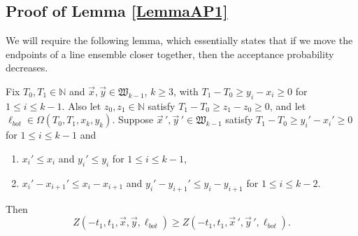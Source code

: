 	
	
	\subsection{Proof of Lemma \ref{LemmaAP1}}
	
	We will require the following lemma, which essentially states that if we move the endpoints of a line ensemble closer together, then the acceptance probability decreases.
	
	\begin{lemma}\label{APsqueezing}
		Fix $T_0,T_1\in\mathbb{N}$ and $\vec{x},\vec{y}\in\mathfrak{W}_{k-1}$, $k\geq 3$, with $T_1 - T_0 \geq y_i - x_i \geq 0$ for $1\leq i\leq k-1$. Also let $z_0, z_1 \in\mathbb{N}$ satisfy $T_1 - T_0 \geq z_1 - z_0 \geq 0$, and let $\ell_{bot}\in\Omega(T_0,T_1,x_k,y_k)$. Suppose $\vec{x}\,', \vec{y}\,' \in\mathfrak{W}_{k-1}$ satisfy $T_1 - T_0 \geq y_i' - x_i' \geq 0$ for $1\leq i\leq k-1$ and
		\begin{enumerate}[label = (\arabic*)]
			
			\item $x_i' \leq x_i$ and $y_i' \leq y_i$ for $1\leq i\leq k-1$,
			
			\item $x_i' - x_{i+1}' \leq x_i - x_{i+1}$ and $y_i' - y_{i+1}' \leq y_i - y_{i+1}$ for $1\leq i\leq k-2$.
			
		\end{enumerate}
		Then
		\[
		Z(-t_1,t_1,\vec{x},\vec{y},\ell_{bot}) \geq Z(-t_1,t_1,\vec{x}\,', \vec{y}\,', \ell_{bot}).
		\]
	\end{lemma}
	
